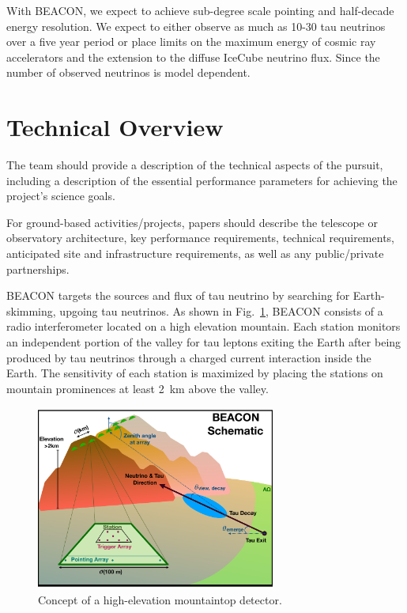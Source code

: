 \documentclass[12pt]{article}
\begin{document}
With BEACON, we expect to achieve sub-degree scale pointing and half-decade energy resolution. We expect to either observe as much as 10-30 tau neutrinos over a five year period or place limits on the maximum energy of cosmic ray accelerators and the extension to the diffuse IceCube neutrino flux.  Since the number of observed neutrinos is model dependent. 

\section{Technical Overview}
\color{blue}
The team should provide a description of the technical aspects of the pursuit, including a description of the essential performance parameters for achieving the project's science goals.

For ground-based activities/projects, papers should describe the telescope or observatory architecture, key performance requirements, technical requirements, anticipated site and infrastructure requirements, as well as any public/private partnerships.
\color{black}

BEACON targets the sources and flux of tau neutrino by searching for Earth-skimming, upgoing tau neutrinos. As shown in Fig.~\ref{fig:concept}, BEACON consists of a radio interferometer located on a high elevation mountain. Each station monitors an independent portion of the valley for tau leptons exiting the Earth after being produced by tau neutrinos through a charged current interaction inside the Earth. The sensitivity of each station is maximized by placing the stations on mountain prominences at least 2~km above the valley. 

\begin{figure}[htbp]
\begin{center}
\includegraphics[width=0.7\textwidth]{figures/BEACON_ICRC_Concept.pdf}
\caption{Concept of a high-elevation mountaintop detector.}
\label{fig:concept}
\end{center}
\end{figure}
\end{document}
